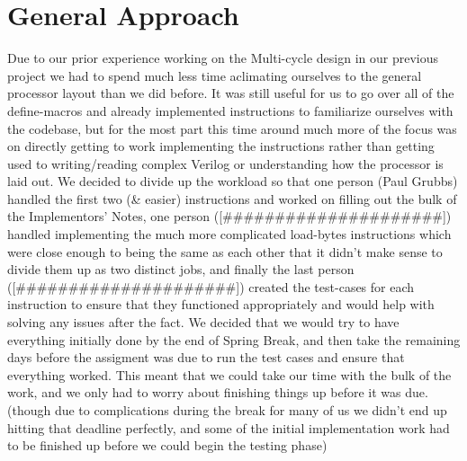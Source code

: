 \documentclass[acmtog]{acmart}
\begin{document}
\section{General Approach}
Due to our prior experience working on the Multi-cycle design in our previous project we had to spend much less time aclimating ourselves to the general processor layout than we did before. It was still useful for us to go over all of the define-macros and already implemented instructions to familiarize ourselves with the codebase, but for the most part this time around much more of the focus was on directly getting to work implementing the instructions rather than getting used to writing/reading complex Verilog or understanding how the processor is laid out. We decided to divide up the workload so that one person (Paul Grubbs) handled the first two (\& easier) instructions and worked on filling out the bulk of the Implementors' Notes, one person ([\#\#\#\#\#\#\#\#\#\#\#\#\#\#\#\#\#\#\#\#\#]) handled implementing the much more complicated load-bytes instructions which were close enough to being the same as each other that it didn't make sense to divide them up as two distinct jobs, and finally the last person ([\#\#\#\#\#\#\#\#\#\#\#\#\#\#\#\#\#\#\#\#\#]) created the test-cases for each instruction to ensure that they functioned appropriately and would help with solving any issues after the fact. We decided that we would try to have everything initially done by the end of Spring Break, and then take the remaining days before the assigment was due to run the test cases and ensure that everything worked. This meant that we could take our time with the bulk of the work, and we only had to worry about finishing things up before it was due. (though due to complications during the break for many of us we didn't end up hitting that deadline perfectly, and some of the initial implementation work had to be finished up before we could begin the testing phase)
\end{document}
